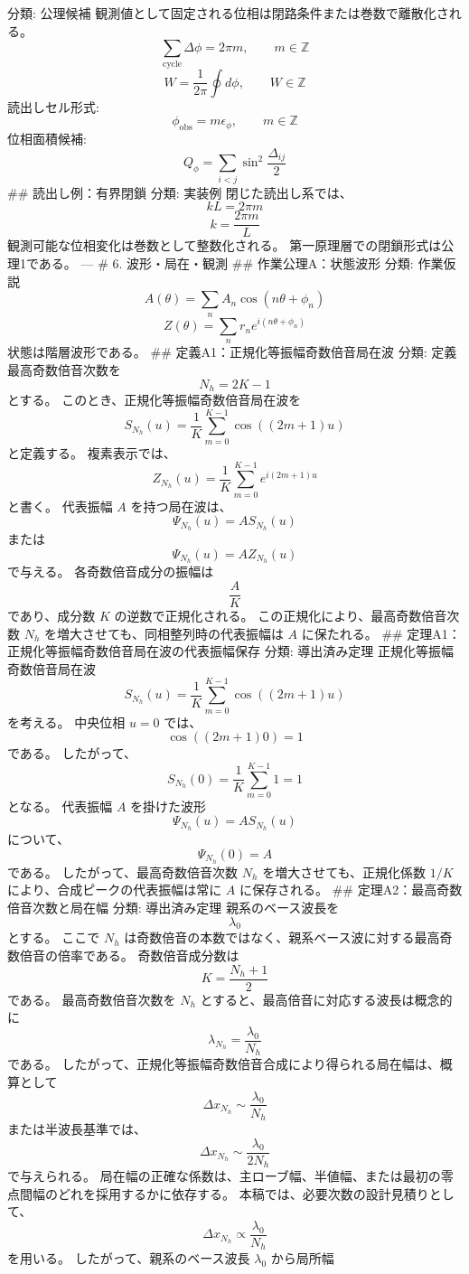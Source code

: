 \documentclass[
  a4paper]{ltjsarticle}
\begin{document}
分類: 公理候補
観測値として固定される位相は閉路条件または巻数で離散化される。 \[
\sum_{\mathrm{cycle}}\Delta\phi=2\pi m,\qquad m\in\mathbb{Z}
\] \[
W=\frac{1}{2\pi}\oint d\phi,\qquad W\in\mathbb{Z}
\] 読出しセル形式: \[
\phi_{\mathrm{obs}}=m\epsilon_\phi,\qquad m\in\mathbb{Z}
\] 位相面積候補: \[
Q_\phi=\sum_{i<j}\sin^2\frac{\Delta_{ij}}{2}
\] \#\# 読出し例：有界閉鎖 分類: 実装例 閉じた読出し系では、 \[
kL=2\pi m
\] \[
k=\frac{2\pi m}{L}
\] 観測可能な位相変化は巻数として整数化される。
第一原理層での閉鎖形式は公理1である。 --- \# 6. 波形・局在・観測 \#\#
作業公理A：状態波形 分類: 作業仮説 \[
A(\theta)=\sum_n A_n\cos(n\theta+\phi_n)
\] \[
Z(\theta)=\sum_n r_n e^{i(n\theta+\phi_n)}
\] 状態は階層波形である。 \#\# 定義A1：正規化等振幅奇数倍音局在波 分類:
定義 最高奇数倍音次数を \[
N_h=2K-1
\] とする。 このとき、正規化等振幅奇数倍音局在波を \[
S_{N_h}(u)=\frac{1}{K}\sum_{m=0}^{K-1}\cos((2m+1)u)
\] と定義する。 複素表示では、 \[
Z_{N_h}(u)=\frac{1}{K}\sum_{m=0}^{K-1}e^{i(2m+1)u}
\] と書く。 代表振幅 \(A\) を持つ局在波は、 \[
\Psi_{N_h}(u)=A S_{N_h}(u)
\] または \[
\Psi_{N_h}(u)=A Z_{N_h}(u)
\] で与える。 各奇数倍音成分の振幅は \[
\frac{A}{K}
\] であり、成分数 \(K\) の逆数で正規化される。
この正規化により、最高奇数倍音次数 \(N_h\)
を増大させても、同相整列時の代表振幅は \(A\) に保たれる。 \#\#
定理A1：正規化等振幅奇数倍音局在波の代表振幅保存 分類: 導出済み定理
正規化等振幅奇数倍音局在波 \[
S_{N_h}(u)=\frac{1}{K}\sum_{m=0}^{K-1}\cos((2m+1)u)
\] を考える。 中央位相 \(u=0\) では、 \[
\cos((2m+1)0)=1
\] である。 したがって、 \[
S_{N_h}(0)=\frac{1}{K}\sum_{m=0}^{K-1}1=1
\] となる。 代表振幅 \(A\) を掛けた波形 \[
\Psi_{N_h}(u)=A S_{N_h}(u)
\] について、 \[
\Psi_{N_h}(0)=A
\] である。 したがって、最高奇数倍音次数 \(N_h\)
を増大させても、正規化係数 \(1/K\) により、合成ピークの代表振幅は常に
\(A\) に保存される。 \#\# 定理A2：最高奇数倍音次数と局在幅 分類:
導出済み定理 親系のベース波長を \[
\lambda_0
\] とする。 ここで \(N_h\)
は奇数倍音の本数ではなく、親系ベース波に対する最高奇数倍音の倍率である。
奇数倍音成分数は \[
K=\frac{N_h+1}{2}
\] である。 最高奇数倍音次数を \(N_h\)
とすると、最高倍音に対応する波長は概念的に \[
\lambda_{N_h}=\frac{\lambda_0}{N_h}
\] である。
したがって、正規化等振幅奇数倍音合成により得られる局在幅は、概算として
\[
\Delta x_{N_h}\sim\frac{\lambda_0}{N_h}
\] または半波長基準では、 \[
\Delta x_{N_h}\sim\frac{\lambda_0}{2N_h}
\] で与えられる。
局在幅の正確な係数は、主ローブ幅、半値幅、または最初の零点間幅のどれを採用するかに依存する。
本稿では、必要次数の設計見積りとして、 \[
\Delta x_{N_h}\propto\frac{\lambda_0}{N_h}
\] を用いる。 したがって、親系のベース波長 \(\lambda_0\) から局所幅
\end{document}
